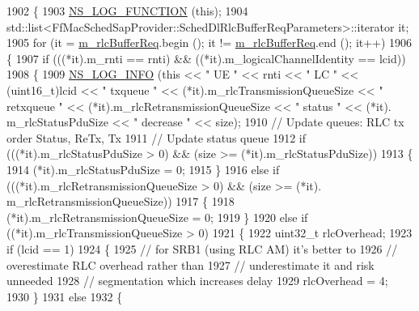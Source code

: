 \begin{DoxyCode}
1902 \{
1903   \hyperlink{log-macros-disabled_8h_a90b90d5bad1f39cb1b64923ea94c0761}{NS\_LOG\_FUNCTION} (\textcolor{keyword}{this});
1904   std::list<FfMacSchedSapProvider::SchedDlRlcBufferReqParameters>::iterator it;
1905   \textcolor{keywordflow}{for} (it = \hyperlink{classns3_1_1RrFfMacScheduler_a25a4bfbb928e22dc026209de004b90fd}{m\_rlcBufferReq}.begin (); it != \hyperlink{classns3_1_1RrFfMacScheduler_a25a4bfbb928e22dc026209de004b90fd}{m\_rlcBufferReq}.end (); it++)
1906     \{
1907       \textcolor{keywordflow}{if} (((*it).m\_rnti == rnti) && ((*it).m\_logicalChannelIdentity == lcid))
1908         \{
1909           \hyperlink{group__logging_gafbd73ee2cf9f26b319f49086d8e860fb}{NS\_LOG\_INFO} (\textcolor{keyword}{this} << \textcolor{stringliteral}{" UE "} << rnti << \textcolor{stringliteral}{" LC "} << (uint16\_t)lcid << \textcolor{stringliteral}{" txqueue "} << 
      (*it).m\_rlcTransmissionQueueSize << \textcolor{stringliteral}{" retxqueue "} << (*it).m\_rlcRetransmissionQueueSize << \textcolor{stringliteral}{" status "} << (*it).
      m\_rlcStatusPduSize << \textcolor{stringliteral}{" decrease "} << size);
1910           \textcolor{comment}{// Update queues: RLC tx order Status, ReTx, Tx}
1911           \textcolor{comment}{// Update status queue}
1912            \textcolor{keywordflow}{if} (((*it).m\_rlcStatusPduSize > 0) && (size >= (*it).m\_rlcStatusPduSize))
1913               \{
1914                 (*it).m\_rlcStatusPduSize = 0;
1915               \}
1916             \textcolor{keywordflow}{else} \textcolor{keywordflow}{if} (((*it).m\_rlcRetransmissionQueueSize > 0) && (size >= (*it).
      m\_rlcRetransmissionQueueSize))
1917               \{
1918                 (*it).m\_rlcRetransmissionQueueSize = 0;
1919               \}
1920             \textcolor{keywordflow}{else} \textcolor{keywordflow}{if} ((*it).m\_rlcTransmissionQueueSize > 0)
1921               \{
1922                 uint32\_t rlcOverhead;
1923                 \textcolor{keywordflow}{if} (lcid == 1)
1924                   \{
1925                     \textcolor{comment}{// for SRB1 (using RLC AM) it's better to}
1926                     \textcolor{comment}{// overestimate RLC overhead rather than}
1927                     \textcolor{comment}{// underestimate it and risk unneeded}
1928                     \textcolor{comment}{// segmentation which increases delay }
1929                     rlcOverhead = 4;                                  
1930                   \}
1931                 \textcolor{keywordflow}{else}
1932                   \{

\end{DoxyCode}
